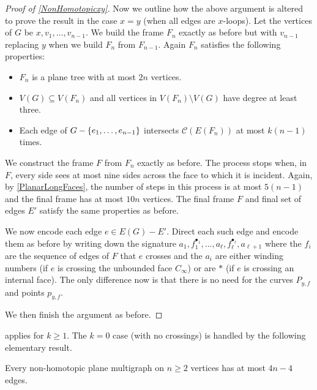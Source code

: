 \documentclass[a4paper,11pt]{article}
\renewcommand{\geq}{\geqslant}
\DeclarePairedDelimiter{\set}{\lbrace}{\rbrace} %
\newcommand{\CC}{\mathcal{C}}
\begin{document}
\begin{proof}[Proof of \cref{NonHomotopicxy}]
Now we outline how the above argument is altered to prove the result in the case $x = y$ (when all edges are $x$-loops). Let the vertices of $G$ be $x, v_1, \dotsc, v_{n - 1}$. We build the frame $F_n$ exactly as before but with $v_{n - 1}$ replacing $y$ when we build $F_n$ from $F_{n - 1}$. Again $F_n$ satisfies the following properties:
\begin{itemize}
    \item $F_n$ is a plane tree with at most $2n$ vertices.
    \item $V(G) \subseteq V(F_n)$ and all vertices in $V(F_n) \setminus V(G)$ have degree at least three.
    \item Each edge of $G - \set{e_1, \dotsc, e_{n - 1}}$ intersects $\CC(E(F_n))$ at most $k(n - 1)$ times.
\end{itemize}
We construct the frame $F$ from $F_n$ exactly as before. The process stops when, in $F$, every side sees at most nine sides across the face to which it is incident. Again, by \cref{PlanarLongFaces}, the number of steps in this process is at most $5(n - 1)$ and the final frame has at most $10n$ vertices. The final frame $F$ and final set of edges $E'$ satisfy the same properties as before.

We now encode each edge $e \in E(G) - E'$. Direct each such edge and encode them as before by writing down the signature $a_1, f_1^{\bullet_1}, \dotsc, a_{\ell}, f_{\ell}^{\bullet_{\ell}}, a_{\ell + 1}$ where the $f_i$ are the sequence of edges of $F$ that $e$ crosses and the $a_i$ are either winding numbers (if $e$ is crossing the unbounded face $C_{\infty}$) or are $\ast$ (if $e$ is crossing an internal face). The only difference now is that there is no need for the curves $P_{y, f}$ and points $p_{y, f}$.

We then finish the argument as before.
\end{proof}

 applies for $k \geq 1$. The $k = 0$ case (with no crossings) is handled by the following elementary result.

\begin{proposition}\label{NonHomotopicPlaneMultigraph}
    Every non-homotopic plane multigraph on $n \geq 2$ vertices has at most $4n - 4$ edges.
\end{proposition}
\end{document}
